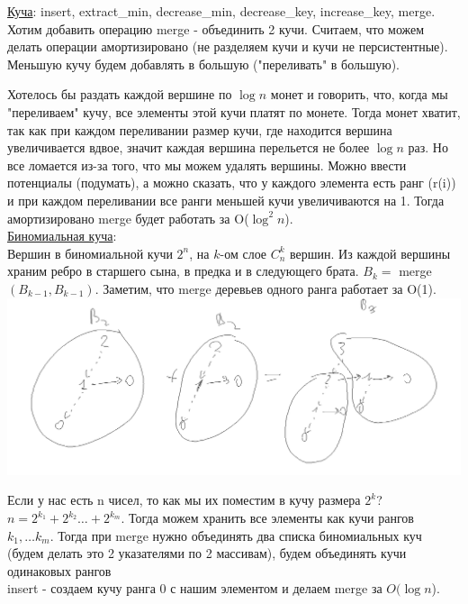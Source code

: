 \documentclass{article}
\newcommand{\tu}[1]{\underline{#1}}
\begin{document}
\tu{Куча}: insert, extract\_min, decrease\_min, decrease\_key, increase\_key, merge. Хотим добавить операцию merge - объединить 2 кучи. Считаем, что можем делать операции амортизировано (не разделяем кучи и кучи не персистентные). Меньшую кучу будем добавлять в большую ("переливать" в большую). 

Хотелось бы раздать каждой вершине по $\log n$ монет и говорить, что, когда мы "переливаем" кучу, все элементы этой кучи платят по монете. Тогда монет хватит, так как при каждом переливании размер кучи, где находится вершина увеличивается вдвое, значит каждая вершина перельется не более $\log n$ раз. Но все ломается из-за того, что мы можем удалять вершины. Можно ввести потенциалы (подумать), а можно сказать, что у каждого элемента есть ранг (r(i)) и при каждом переливании все ранги меньшей кучи увеличиваются на 1. Тогда амортизировано merge будет работать за O($\log^2 n$). \\

\tu{Биномиальная куча}: \\

Вершин в биномиальной кучи $2^n$, на $k$-ом слое $C_n^k$ вершин. Из каждой вершины храним ребро в старшего сына, в предка и в следующего брата. $B_k = $ merge$(B_{k-1}, B_{k-1})$. %
Заметим, что merge деревьев одного ранга работает за O(1). \\

\includegraphics[width=15cm]{pictures/binominial_heap_add.png}


Если у нас есть n чисел, то как мы их поместим в кучу размера $2^k$? $n = 2^{k_1} + 2^{k_2} \dots + 2^{k_m}$. Тогда можем хранить все элементы как кучи рангов $k_1, \dots k_m$. Тогда при merge нужно объединять два списка биномиальных куч (будем делать это 2 указателями по 2 массивам), будем объединять кучи одинаковых рангов \\ %

insert - создаем кучу ранга 0 с нашим элементом и делаем merge за $O(\log n$).
\end{document}

